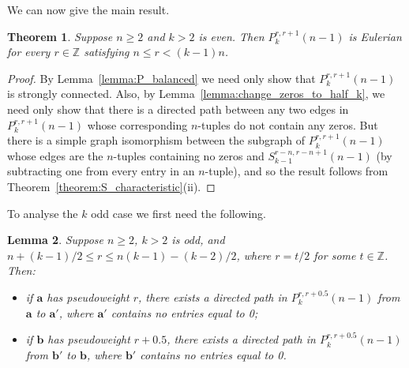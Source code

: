 \documentclass[a4paper,11pt]{article}
\theoremstyle{plain}
\newtheorem{lemma}{Lemma}[section]
\newtheorem{theorem}[lemma]{Theorem}
\theoremstyle{definition}
\theoremstyle{remark}
\begin{document}
We can now give the main result.

\begin{theorem} \label{theorem:P_characteristic_k_even}
Suppose $n\geq2$ and $k>2$ is even. Then $P_k^{r,r+1}(n-1)$ is Eulerian for every $r\in \mathbb{Z}$
satisfying $n\leq r<(k-1)n$.
\end{theorem}

\begin{proof}
By Lemma~\ref{lemma:P_balanced} we need only show that $P_k^{r,r+1}(n-1)$ is strongly connected.
Also, by Lemma~\ref{lemma:change_zeros_to_half_k}, we need only show that there is a directed path
between any two edges in $P_k^{r,r+1}(n-1)$ whose corresponding $n$-tuples do not contain any
zeros.  But there is a simple graph isomorphism between the subgraph of $P_k^{r,r+1}(n-1)$ whose
edges are the $n$-tuples containing no zeros and $S_{k-1}^{r-n,r-n+1}(n-1)$ (by subtracting one
from every entry in an $n$-tuple), and so the result follows from
Theorem~\ref{theorem:S_characteristic}(ii).
\end{proof}

To analyse the $k$ odd case we first need the following.

\begin{lemma}  \label{lemma:k_odd_zero-free_path}
Suppose $n\geq2$, $k>2$ is odd, and $n+(k-1)/2\leq r \leq n(k-1)-(k-2)/2$, where $r=t/2$ for some
$t\in\mathbb{Z}$.  Then:
\begin{itemize}
\item[(i)] if $\mathbf{a}$ has pseudoweight $r$, there exists a directed path in
    $P_k^{r,r+0.5}(n-1)$ from $\mathbf{a}$ to $\mathbf{a}'$, where $\mathbf{a}'$ contains no
    entries equal to 0;
\item[(ii)] if $\mathbf{b}$ has pseudoweight $r+0.5$, there exists a directed path in
    $P_k^{r,r+0.5}(n-1)$ from $\mathbf{b}'$ to $\mathbf{b}$, where $\mathbf{b}'$ contains no
    entries equal to 0.
\end{itemize}
\end{lemma}
\end{document}
